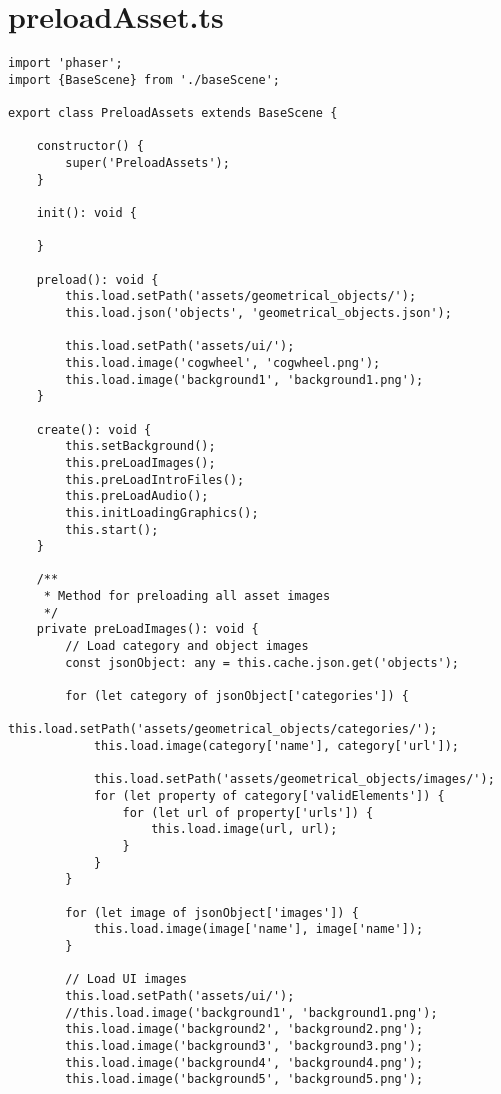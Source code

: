 \section{preloadAsset.ts}\label{sec:preloadasset.ts}
\begin{lstlisting}[style=TypeScript, caption={preloadAsset.ts}]
import 'phaser';
import {BaseScene} from './baseScene';

export class PreloadAssets extends BaseScene {

    constructor() {
        super('PreloadAssets');
    }

    init(): void {

    }

    preload(): void {
        this.load.setPath('assets/geometrical_objects/');
        this.load.json('objects', 'geometrical_objects.json');

        this.load.setPath('assets/ui/');
        this.load.image('cogwheel', 'cogwheel.png');
        this.load.image('background1', 'background1.png');
    }

    create(): void {
        this.setBackground();
        this.preLoadImages();
        this.preLoadIntroFiles();
        this.preLoadAudio();
        this.initLoadingGraphics();
        this.start();
    }

    /**
     * Method for preloading all asset images
     */
    private preLoadImages(): void {
        // Load category and object images
        const jsonObject: any = this.cache.json.get('objects');

        for (let category of jsonObject['categories']) {
            this.load.setPath('assets/geometrical_objects/categories/');
            this.load.image(category['name'], category['url']);

            this.load.setPath('assets/geometrical_objects/images/');
            for (let property of category['validElements']) {
                for (let url of property['urls']) {
                    this.load.image(url, url);
                }
            }
        }

        for (let image of jsonObject['images']) {
            this.load.image(image['name'], image['name']);
        }

        // Load UI images
        this.load.setPath('assets/ui/');
        //this.load.image('background1', 'background1.png');
        this.load.image('background2', 'background2.png');
        this.load.image('background3', 'background3.png');
        this.load.image('background4', 'background4.png');
        this.load.image('background5', 'background5.png');


\end{lstlisting}

